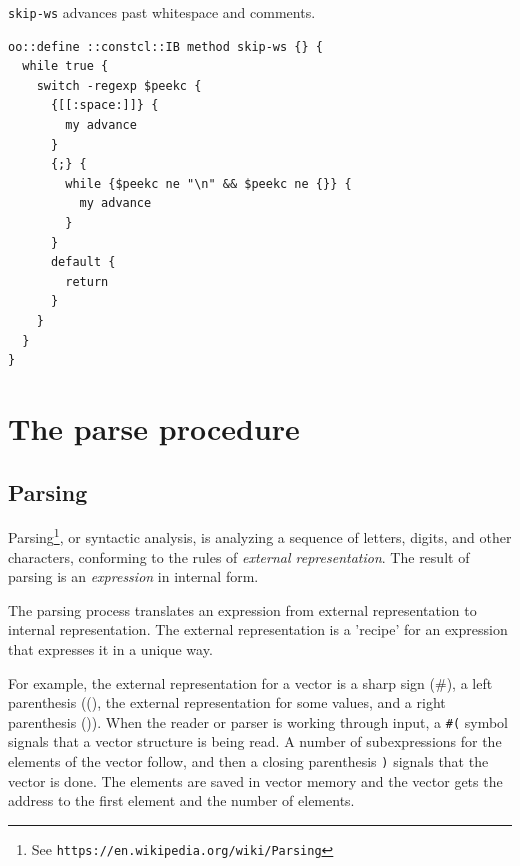 \documentclass[twoside,9pt]{report}
\begin{document}
\texttt{skip-ws} advances past whitespace and comments.

\noindent\makebox[\linewidth]{\rule{\linewidth}{0.4pt}}
\begin{lstlisting}
oo::define ::constcl::IB method skip-ws {} {
  while true {
    switch -regexp $peekc {
      {[[:space:]]} {
        my advance
      }
      {;} {
        while {$peekc ne "\n" && $peekc ne {}} {
          my advance
        }
      }
      default {
        return
      }
    }
  }
}
\end{lstlisting}
\noindent\makebox[\linewidth]{\rule{\linewidth}{0.4pt}}
\section{The parse procedure}
\label{the-parse-procedure}
\subsection{Parsing}
\label{parsing}

Parsing\footnote{See \texttt{https://en.wikipedia.org/wiki/Parsing}}, or syntactic analysis, is analyzing a sequence of letters, digits, and other characters, conforming to the rules of \emph{external representation}. The result of parsing is an \emph{expression} in internal form.


The parsing process translates an expression from external representation to internal representation. The external representation is a 'recipe' for an expression that expresses it in a unique way.


For example, the external representation for a vector is a sharp sign (\#), a left parenthesis ((), the external representation for some values, and a right parenthesis ()). When the reader or parser is working through input, a \texttt{\#(} symbol signals that a vector structure is being read. A number of subexpressions for the elements of the vector follow, and then a closing parenthesis \texttt{)} signals that the vector is done. The elements are saved in vector memory and the vector gets the address to the first element and the number of elements.
\end{document}
